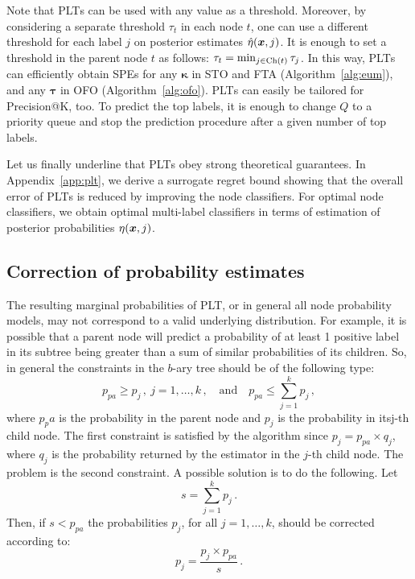 \documentclass{article}
\newcommand{\btau}{\boldsymbol{\tau}}
\newcommand{\bkappa}{\boldsymbol{\kappa}}
\newcommand{\Algo}[1]{\textsc{#1}}
\newcommand{\sectionBefore}{-0pt}
\newcommand{\sectionAfter}{-0pt}
\begin{document}

Note that \Algo{PLT}s can be used with any value as a threshold. Moreover, by considering a separate threshold $\tau_t$ in each node $t$, one can use a different threshold for each label $j$ on posterior estimates $\hat\eta(\boldsymbol{x},j)$. It is enough to set a threshold in the parent node $t$ as follows:
$\tau_t = \min_{j \in \mathrm{Ch}(t)} \tau_j$. 
In this way, \Algo{PLT}s  can efficiently obtain SPEs for any $\bkappa$ in \Algo{STO} and \Algo{FTA} (Algorithm~\ref{alg:eum}), and any $\btau$ in \Algo{OFO} (Algorithm~\ref{alg:ofo}). 
%
\Algo{PLT}s can easily be tailored for Precision@K, too. To predict the top labels, it is enough to change $Q$ to a priority queue and stop the prediction procedure after a given number of top labels. %

Let us finally underline that  \Algo{PLT}s obey strong theoretical guarantees. In  Appendix~\ref{app:plt}, we derive a surrogate regret bound showing that the overall error of \Algo{PLT}s is reduced by improving the node classifiers. For optimal node classifiers, we obtain optimal multi-label classifiers in terms of estimation of posterior probabilities $\eta(\boldsymbol{x},j)$.


\vspace{\sectionBefore}
\subsection{Correction of probability estimates}
\label{sec:online_PLTs}
\vspace{\sectionAfter}

The resulting marginal probabilities of PLT, or in general all node probability models, may not correspond to a valid underlying distribution. For example, it is possible that a parent node will predict a probability of at least 1 positive label in its subtree being greater than a sum of similar probabilities of its children. So, in general the constraints in the $b$-ary tree should be of the following type:
$$p_{pa} \ge p_j\,,~j=1,\ldots, k\,, \quad \mathrm{and} \quad  p_{pa} \le \sum_{j=1}^k p_j\,, $$
where $p_pa$ is the probability in the parent node and $p_j$ is the probability in its$ $j-th child node.
The first constraint is satisfied by the algorithm since $p_j = p_{pa} \times q_j$, where $q_j$ is the probability returned by the estimator in the $j$-th child node. The problem is the second constraint. A possible solution is to do the following. Let 
$$
s = \sum_{j=1}^k p_j\,.
$$
Then, if $s < p_{pa}$ the probabilities $p_j$, for all $j = 1, \ldots, k$, should be corrected according to:
$$
p_j = \frac{p_j \times p_{pa}}{s}\,.
$$
\end{document}
